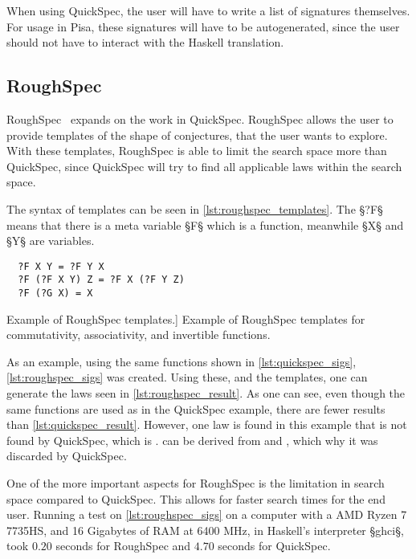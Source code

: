 When using QuickSpec, the user will have to write a list of signatures themselves.
For usage in Pisa, these signatures will have to be autogenerated, since the user should not have to interact with the Haskell translation.

\subsection{RoughSpec}\label{sec:quickspec:roughspec}
RoughSpec~\autocite{Roughspec} expands on the work in QuickSpec.
RoughSpec allows the user to provide templates of the shape of conjectures, that the user wants to explore.
With these templates, RoughSpec is able to limit the search space more than QuickSpec, since QuickSpec will try to find all applicable laws within the search space.

The syntax of templates can be seen in \cref{lst:roughspec_templates}.
The §?F§ means that there is a meta variable §F§ which is a function, meanwhile §X§ and §Y§ are variables.

\begin{listing}[ht]
\begin{verbatim}
  ?F X Y = ?F Y X
  ?F (?F X Y) Z = ?F X (?F Y Z)
  ?F (?G X) = X
\end{verbatim}
\caption
  [Example of RoughSpec templates.]
  {Example of RoughSpec templates for commutativity, associativity, and invertible functions.}
\label{lst:roughspec_templates}
\end{listing}

As an example, using the same functions shown in \cref{lst:quickspec_sigs}, \cref{lst:roughspec_sigs} was created.
Using these, and the templates, one can generate the laws seen in \cref{lst:roughspec_result}.
As one can see, even though the same functions are used as in the QuickSpec example, there are fewer results than \cref{lst:quickspec_result}.
However, one law is found in this example that is not found by QuickSpec, which is .
 can be derived from  and , which why it was discarded by QuickSpec.

One of the more important aspects for RoughSpec is the limitation in search space compared to QuickSpec.
This allows for faster search times for the end user.
Running a test on \cref{lst:roughspec_sigs} on a computer with a AMD Ryzen 7 7735HS, and 16 Gigabytes of RAM at 6400 MHz, in Haskell's interpreter §ghci§, took $0.20$ seconds for RoughSpec and $4.70$ seconds for QuickSpec.

